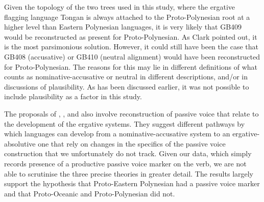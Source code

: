 \documentclass[draft,10pt]{article} %
\begin{document}
Given the topology of the two trees used in this study, where the ergative flagging language Tongan is always attached to the Proto-Polynesian root at a higher level than Eastern Polynesian languages, it is very likely that GB409 would be reconstructed as present for Proto-Polynesian. As Clark pointed out, it is the most parsimonious solution. However, it could still have been the case that GB408 (accusative) or GB410 (neutral alignment) would have been reconstructed for Proto-Polynesian. The reasons for this may lie in different definitions of what counts as nominative-accusative or neutral in different descriptions, and/or in discussions of plausibility. As has been discussed earlier, it was not possible to include plausibility as a factor in this study.

The proposals of \citet{hale_1968}, \citet{hohepa_1967, hohepa_1969}, and \citet{chung1978} also involve reconstruction of passive voice that relate to the development of the ergative systems. They suggest different pathways by which languages can develop from a nominative-accusative system to an ergative-absolutive one that rely on changes in the specifics of the passive voice construction that we unfortunately do not track. Given our data, which simply records presence of a productive passive voice marker on the verb, we are not able to scrutinise the three precise theories in greater detail. The results largely support the hypothesis that Proto-Eastern Polynesian had a passive voice marker and that Proto-Oceanic and Proto-Polynesian did not. %


\end{document}
